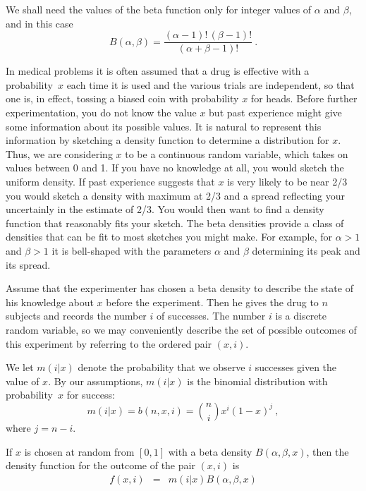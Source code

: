 
We shall need the values of the beta function only for integer values of
$\alpha$ and $\beta$, and in this case
$$
B(\alpha,\beta) = \frac{(\alpha - 1)!\,(\beta - 1)!}{(\alpha + \beta - 1)!}\ .
$$

\begin{example}\label{exam 4.16}
In medical problems it is often assumed that a drug is effective with a
probability~$x$ each time it is used and the various trials are
independent, so that one is, in effect, tossing a biased coin with probability
$x$ for heads.  
Before further experimentation, you do not know the value $x$ but past experience might give
some information about its possible values. It is natural to represent this information
by sketching a density function
to determine a distribution for $x$.  Thus, we are considering $x$ to be a continuous random
variable, which takes on values between 0 and 1.  If you have no knowledge at all, you would
sketch the uniform density.  If past experience suggests that
$x$ is very likely to be near 2/3 you would sketch a density with maximum at 2/3 and a
spread reflecting your uncertainly in the estimate of 2/3. You would then want to find a
density function that reasonably fits your sketch.  The beta densities provide a class of
densities that can be fit to most sketches you might make. For example, for
$\alpha > 1$ and $\beta > 1$ it is bell-shaped with the parameters $\alpha$ and $\beta$
determining its peak and its spread. 
\par
Assume that the experimenter has chosen a beta density to describe the state of
his knowledge about $x$ before the experiment.  Then he gives the drug to $n$
subjects and records the number $i$ of successes.   The number $i$ is a discrete random
variable, so we may conveniently describe the set of possible outcomes of this experiment
by referring to the ordered pair $(x, i)$.
\par
We let $m(i|x)$ denote the probability that we observe $i$ successes given the value of $x$.  By our
assumptions, $m(i|x)$ is the binomial distribution with probability~$x$ for success:
$$
m(i|x) = b(n,x,i) = {n \choose i} x^i(1 - x)^j\ ,
$$
where $j = n - i$.  
\par
If $x$ is chosen at random from $[0,1]$ with a beta
density $B(\alpha,\beta,x)$, then the density function for the outcome of the
pair $(x,i)$ is
\begin{eqnarray*}
f(x,i) & = & m(i|x)B(\alpha,\beta,x) \\

\end{eqnarray*}
\end{example}

